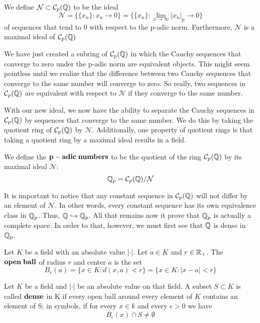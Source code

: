 \documentclass[a4paper]{article}
\begin{document}
\begin{definition}
We define $\mathcal{N}\subset\mathcal{C}_p(\mathbb Q)$ to be the ideal
\[
  \mathcal{N}=\Big\{\{x_n\}:x_n\to 0\Big\}=
  \Big\{\{x_n\}:\lim_{x\to\infty}|x_n|_p\to 0\Big\}
\]
of sequences that tend to 0 with respect to the p-adic norm. 
Furthermore, $\mathcal{N}$ is a maximal ideal of 
$\mathcal{C}_p(\mathbb Q)$
\end{definition}

We have just created a subring of $\mathcal{C}_p(\mathbb
Q)$ in which the Cauchy sequences that converge to zero
under the p-adic norm are equivalent objects.  This might seem
pointless until we realize that the difference between two Cauchy
sequences that converge to the same number will
converge to zero.  So really, two sequences in $\mathcal{C}_p(\mathbb Q)$ 
are equivalent with respect to $\mathcal{N}$ if they converge to the 
same number.

With our new ideal, we now have the ability to separate the Cauchy
sequences in $\mathcal{C}_p(\mathbb Q)$ by sequences that converge to
the same number.  We do this by taking the quotient ring of
$\mathcal{C}_p(\mathbb Q)$ by $\mathcal{N}$.  Additionally, one property of
quotient rings is that taking a quotient ring by a maximal ideal
results in a field.

\begin{definition}[$\mb Q_p$]
We define the $\bf{p-adic\;numbers}$ to be the quotient of the ring
$\mathcal{C}_p(\mathbb Q)$ by its maximal ideal $\mathcal{N}$:
\[
	\mathbb Q_p=\mathcal{C}_p(\mathbb Q)/\mathcal{N}
\]
\end{definition}

It is important to notice that any constant sequence in
$\mathcal{C}_p(\mathbb Q)$ will not differ by an element of
$\mathcal{N}$.  In other words, every constant sequence has its
own equivalence class in \(\mb Q_p\).  Thus, 
\(\mathbb Q\hookrightarrow\mathbb Q_p\).  All that remains now it prove
that \(\mb Q_p\) is actually a complete space.  In order to that, however,
we must first see that $\mathbb Q$ is dense in $\mb Q_p$.

\begin{definition}
Let $K$ be a field with an absolute value $|\cdot|$.  Let $a\in K$ and 
$r\in\mathbb R_+$.  The \(\bf{open\;ball}\) of radius $r$ and center $a$ is the set
\[
  B_r(a)=\{x\in K:d(x,a)<r\}=\{x\in K:|x-a|<r\}
\]
\end{definition}

\begin{definition}
Let $K$ be a field and $|\cdot|$ be an absolute value on that field.  
A subset $S\subset K$ is called $\bf{dense}$ in K if every open ball around
every element of $K$ contains an element of S; in symbols, if for 
every $x\in k$ and every $\epsilon > 0$ we have
\[
	B_\epsilon(x)\cap S\neq\emptyset
\]
\end{definition}
\end{document}
